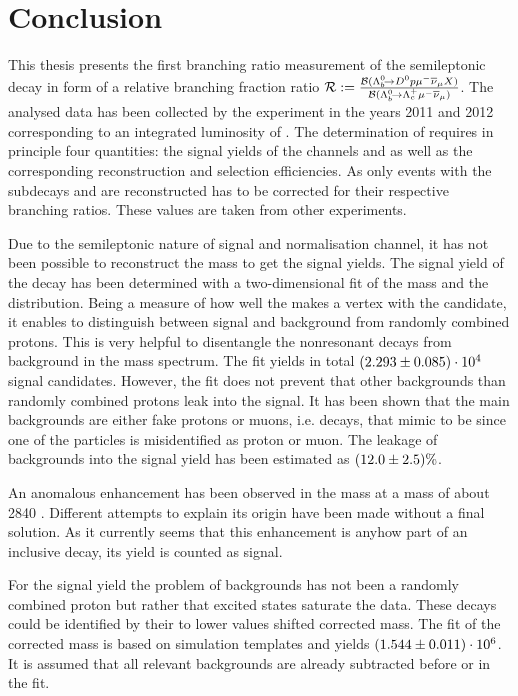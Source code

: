 \chapter{Conclusion}
\label{sec:Conclusion}
This thesis presents the first branching ratio measurement of the semileptonic decay \LbToDpmunuX in form of a relative branching fraction ratio $\mathcal{R} := \frac{{\cal B}({{\Lambda}^0_{b}}\!\rightarrow {\ensuremath{{D}^0}}{\ensuremath{p}}{\ensuremath{\mu^-}}{\ensuremath{{\overline{\nu}}_\mu}} X)}{{\cal B}({{\Lambda}^0_{b}}\!\rightarrow {\ensuremath{{\Lambda}^+_{c}}}{\ensuremath{\mu^-}}{\ensuremath{{\overline{\nu}}_\mu}})}$.
The analysed data has been collected by the \lhcb experiment in the years 2011 and 2012 corresponding to an integrated luminosity of \intlum{3\invfb}.
The determination of \R requires in principle four quantities: the signal yields of the channels \LbToDpmunuX and \LbToLcmunu as well as the corresponding reconstruction and selection efficiencies.
As only events with the subdecays \DToKpi and \LcTopKpi are reconstructed \R has to be corrected for their respective branching ratios.
These values are taken from other experiments.

Due to the semileptonic nature of signal and normalisation channel, it has not been possible to reconstruct the \Lb mass to get the signal yields.
The signal yield of the decay \LbToDpmunuX has been determined with a two-dimensional fit of the \Dz\proton mass and the \logIP distribution.
Being a measure of how well the \proton makes a vertex with the \Dz\mun candidate, it enables to distinguish between signal and background from randomly combined protons.
This is very helpful to disentangle the nonresonant \LbToDpmunuX decays from background in the \Dz\proton mass spectrum.
The fit yields in total $(2.293 \pm 0.085)\cdot 10^{4}$ signal candidates.
However, the fit does not prevent that other backgrounds than randomly combined protons leak into the signal.
It has been shown that the main backgrounds are either fake protons or muons, i.e. decays, that mimic to be \LbToDpmunuX since one of the particles is misidentified as proton or muon.
The leakage of backgrounds into the signal yield has been estimated as $(12.0 \pm 2.5)\%$.

An anomalous enhancement has been observed in the \Dz\proton mass at a mass of about 2840 \mev.
Different attempts to explain its origin have been made without a final solution.
As it currently seems that this enhancement is anyhow part of an inclusive \LbToDpmunuX decay, its yield is counted as signal.

For the \LbToLcmunu signal yield the problem of backgrounds has not been a randomly combined proton but rather that excited \Lcstar states saturate the data.
These decays could be identified by their to lower values shifted corrected \Lb mass.
The fit of the corrected mass is based on simulation templates and yields $(1.544 \pm 0.011)\cdot 10^{6}$.
It is assumed that all relevant backgrounds are already subtracted before or in the fit.

